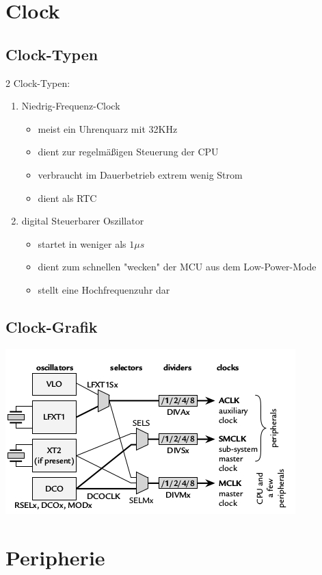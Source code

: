 \documentclass{beamer}
\begin{document}
\section{Clock}
\begin{frame}
\subsection{Clock-Typen}
2 Clock-Typen:
\begin{enumerate}
\item Niedrig-Frequenz-Clock
\begin{itemize}
\item meist ein Uhrenquarz mit 32KHz
\item dient zur regelmäßigen Steuerung der CPU
\item verbraucht im Dauerbetrieb extrem wenig Strom
\item dient als RTC
\end{itemize}
\item digital Steuerbarer Oszillator
\begin{itemize}
\item startet in weniger als $1\mu s$
\item dient zum schnellen "wecken" der MCU aus dem Low-Power-Mode
\item stellt eine Hochfrequenzuhr dar
\end{itemize}
\end{enumerate}
\end{frame}
\subsection{Clock-Grafik}
\begin{frame}
\includegraphics[scale=1,center]{MSP430_clock_dia.jpg}
\end{frame}
\section{Peripherie}
\end{document}
